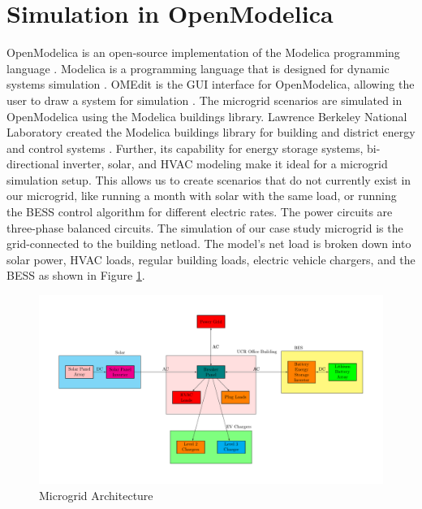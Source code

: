 \documentclass[conference]{IEEEtran}
\begin{document}
\section{Simulation in OpenModelica}
    	OpenModelica is an open-source implementation of the Modelica programming language \cite{OpenModelica}. Modelica is a programming language that is designed for dynamic systems simulation \cite{ModelicaLanguage}. OMEdit is the GUI interface for OpenModelica, allowing the user to draw a system for simulation \cite{OMEdit}. The microgrid scenarios are simulated in OpenModelica using the Modelica buildings library.  Lawrence Berkeley National Laboratory created the Modelica buildings library for building and district energy and control systems \cite{ModelicaBuildingsLibrary}. Further, its capability for energy storage systems, bi-directional inverter, solar, and HVAC modeling make it ideal for a microgrid simulation setup. This allows us to create scenarios that do not currently exist in our microgrid, like running a month with solar with the same load, or running the BESS control algorithm for different electric rates.  The power circuits are three-phase balanced circuits. The simulation of our case study microgrid is the grid-connected to the building netload. The model's net load is broken down into solar power, HVAC loads, regular building loads, electric vehicle chargers, and the BESS as shown in Figure \ref{fig:powersystemsetupfull}.
	\begin{figure}
		\centering
		\includegraphics[width=0.8\linewidth]{Fig/power_system_setup_modelica}
		\caption{Microgrid Architecture}
		\label{fig:powersystemsetupfull}
	\end{figure}
\end{document}
